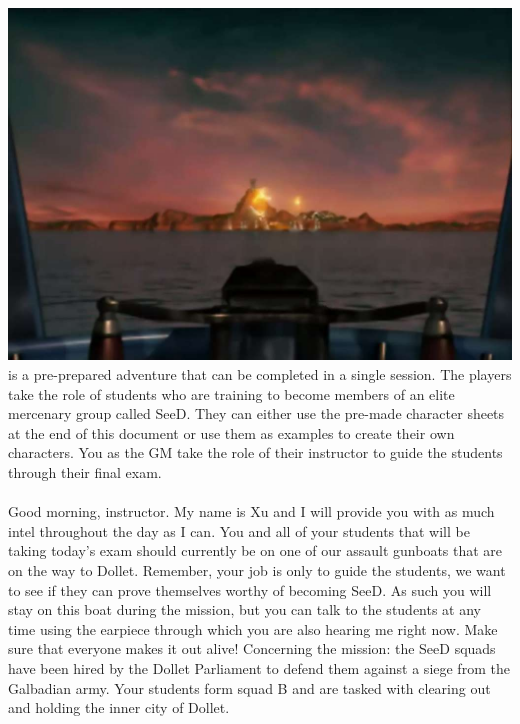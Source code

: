 %
%
\vfill
%
\includegraphics[width=\columnwidth]{./art/siegeofdollet/island.jpg}
%
\vfill
%
 is a pre-prepared adventure that can be completed in a single session.
The players take the role of students who are training to become members of an elite mercenary group called SeeD. 
They can either use the pre-made character sheets at the end of this document or use them as examples to create their
own characters.
You as the GM take the role of their instructor to guide the students through their final exam.
%
\vfill
%
\\\\
%
Good morning, instructor.
My name is Xu and I will provide you with as much intel throughout the day as I can.
You and all of your students that will be taking today's exam should currently be on one of our assault gunboats that are on the way to Dollet.
Remember, your job is only to guide the students, we want to see if they can prove themselves worthy of becoming SeeD.
As such you will stay on this boat during the mission, but you can talk to the students at any time using the earpiece through which you are also hearing me right now.
Make sure that everyone makes it out alive!
%
\vfill
%
Concerning the mission:
the SeeD squads have been hired by the Dollet Parliament to defend them against a siege from the Galbadian army.
Your students form squad B and are tasked with clearing out and holding the inner city of Dollet.
